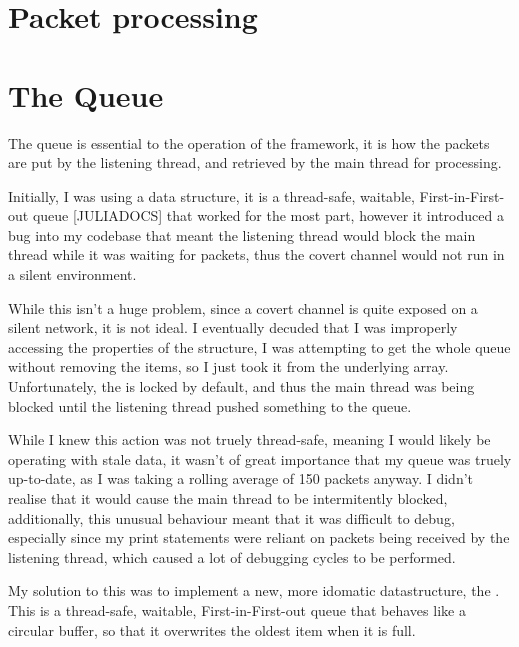 \section{Packet processing}

\section{The Queue}

The queue is essential to the operation of the framework, it is how the packets are put by the listening thread, and retrieved by the main thread for processing.

Initially, I was using a  data structure, it is a thread-safe, waitable, First-in-First-out queue [JULIADOCS] that worked for the most part, however it introduced a bug into my codebase that meant the listening thread would block the main thread while it was waiting for packets, thus the covert channel would not run in a silent environment.

While this isn't a huge problem, since a covert channel is quite exposed on a silent network, it is not ideal. I eventually decuded that I was improperly accessing the properties of the structure, I was attempting to get the whole queue without removing the items, so I just took it from the underlying array. Unfortunately, the  is locked by default, and thus the main thread was being blocked until the listening thread pushed something to the queue.

While I knew this action was not truely thread-safe, meaning I would likely be operating with stale data, it wasn't of great importance that my queue was truely up-to-date, as I was taking a rolling average of 150 packets anyway. I didn't realise that it would cause the main thread to be intermitently blocked, additionally, this unusual behaviour meant that it was difficult to debug, especially since my print statements were reliant on packets being received by the listening thread, which caused a lot of debugging cycles to be performed.

My solution to this was to implement a new, more idomatic datastructure, the . This is a thread-safe, waitable, First-in-First-out queue that behaves like a circular buffer, so that it overwrites the oldest item when it is full.

